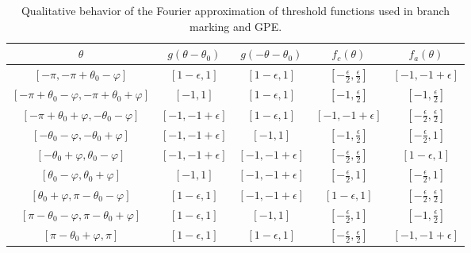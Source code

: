 \documentclass[letterpaper,onecolumn,11pt,accepted=2026-02-14]{quantumarticle}
\theoremstyle{remark}
\theoremstyle{plain}
\begin{document}
\begin{table}[t]
\begin{center}
\begin{tabular}{c|cc|cc}
     $\theta$ & $g(\theta-\theta_0)$ & $g(-\theta-\theta_0)$ & $f_c(\theta)$ & $f_a(\theta)$  \\
     \hline
     $[-\pi,-\pi+\theta_0-\varphi]$ & $[1-\epsilon,1]$ & $[1-\epsilon,1]$ & $[-\frac{\epsilon}{2},\frac{\epsilon}{2}]$ & $[-1,-1+\epsilon]$\\
     $[-\pi+\theta_0-\varphi,-\pi+\theta_0+\varphi]$ & $[-1,1]$ & $[1-\epsilon,1]$ & $[-1,\frac{\epsilon}{2}]$ & $[-1,\frac{\epsilon}{2}]$\\
     $[-\pi+\theta_0+\varphi,-\theta_0-\varphi]$ & $[-1,-1+\epsilon]$ & $[1-\epsilon,1]$ & $[-1,-1+\epsilon]$ & $[-\frac{\epsilon}{2},\frac{\epsilon}{2}]$\\
     $[-\theta_0-\varphi,-\theta_0+\varphi]$ & $[-1,-1+\epsilon]$ & $[-1,1]$ & $[-1,\frac{\epsilon}{2}]$ & $[-\frac{\epsilon}{2},1]$\\
     $[-\theta_0+\varphi,\theta_0-\varphi]$ & $[-1,-1+\epsilon]$ & $[-1,-1+\epsilon]$ & $[-\frac{\epsilon}{2},\frac{\epsilon}{2}]$ & $[1-\epsilon,1]$\\
     $[\theta_0-\varphi,\theta_0+\varphi]$ & $[-1,1]$ & $[-1,-1+\epsilon]$ & $[-\frac{\epsilon}{2},1]$ & $[-\frac{\epsilon}{2},1]$\\
     $[\theta_0+\varphi,\pi-\theta_0-\varphi]$ & $[1-\epsilon,1]$ & $[-1,-1+\epsilon]$ & $[1-\epsilon,1]$ & $[-\frac{\epsilon}{2},\frac{\epsilon}{2}]$\\
     $[\pi-\theta_0-\varphi,\pi-\theta_0+\varphi]$ & $[1-\epsilon,1]$ & $[-1,1]$ & $[-\frac{\epsilon}{2},1]$ & $[-1,\frac{\epsilon}{2}]$\\
     $[\pi-\theta_0+\varphi,\pi]$ & $[1-\epsilon,1]$ & $[1-\epsilon,1]$ & $[-\frac{\epsilon}{2},\frac{\epsilon}{2}]$ & $[-1,-1+\epsilon]$\\
\end{tabular}
\end{center}
    \caption{Qualitative behavior of the Fourier approximation of threshold functions used in branch marking and GPE.}
    \label{tab:fourier_gpe}
\end{table}
\end{document}
